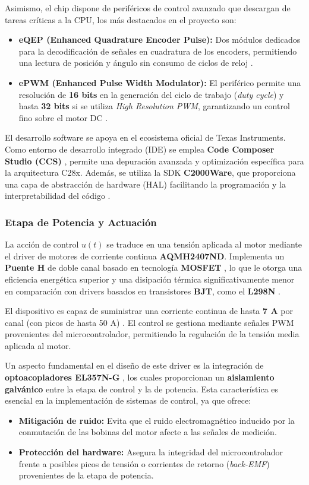 \documentclass[11pt,fleqn]{book} %
\begin{document}
Asimismo, el chip dispone de periféricos de control avanzado que descargan de tareas críticas a la CPU, los más destacados en el proyecto son:
\begin{itemize}
	\item \textbf{eQEP (Enhanced Quadrature Encoder Pulse):} Dos módulos dedicados para la decodificación de señales en cuadratura de los encoders, permitiendo una lectura de posición y ángulo sin consumo de ciclos de reloj \cite{ti_f280049c_ds}.
	\item \textbf{ePWM (Enhanced Pulse Width Modulator):} El periférico permite una resolución de \textbf{16 bits} en la generación del ciclo de trabajo (\textit{duty cycle}) y hasta \textbf{32 bits} si se utiliza \textit{High Resolution PWM}, garantizando un control fino sobre el motor DC \cite{ti_f280049c_ds}.
\end{itemize}

El desarrollo software se apoya en el ecosistema oficial de Texas Instruments. Como entorno de desarrollo integrado (IDE) se emplea \textbf{Code Composer Studio (CCS)} \cite{ti_ccs}, permite una depuración avanzada y optimización específica para la arquitectura C28x. Además, se utiliza la SDK \textbf{C2000Ware}, que proporciona una capa de abstracción de hardware (HAL) facilitando la programación y la interpretabilidad del código \cite{ti_c2000ware}.

\subsubsection{Etapa de Potencia y Actuación}
La acción de control $u(t)$ se traduce en una tensión aplicada al motor mediante el driver de motores de corriente continua \textbf{AQMH2407ND}. Implementa un \textbf{Puente H} de doble canal basado en tecnología \textbf{MOSFET} \cite{handson_aqmh2407nd}, lo que le otorga una eficiencia energética superior y una disipación térmica significativamente menor en comparación con drivers basados en transistores \textbf{BJT}, como el \textbf{L298N} \cite{st_l298_ds}.

El dispositivo es capaz de suministrar una corriente continua de hasta \textbf{7 A} por canal (con picos de hasta 50 A) \cite{handson_aqmh2407nd}. El control se gestiona mediante señales PWM provenientes del microcontrolador, permitiendo la regulación de la tensión media aplicada al motor.

Un aspecto fundamental en el diseño de este driver es la integración de \textbf{optoacopladores EL357N-G} \cite{everlight_el357n_ds}, los cuales proporcionan un \textbf{aislamiento galvánico} entre la etapa de control y la de potencia. Esta característica es esencial en la implementación de sistemas de control, ya que ofrece:
\begin{itemize}
	\item \textbf{Mitigación de ruido:} Evita que el ruido electromagnético inducido por la conmutación de las bobinas del motor afecte a las señales de medición.
	\item \textbf{Protección del hardware:} Asegura la integridad del microcontrolador frente a posibles picos de tensión o corrientes de retorno (\textit{back-EMF}) provenientes de la etapa de potencia.
\end{itemize}
\end{document}
